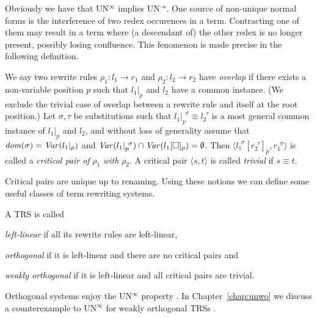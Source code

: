 Obviously we have that UN$^\infty$ implies
UN$^\twoheadrightarrow$. One source of non-unique normal forms is
the interference of two redex occurences in a term. Contracting one of
them may result in a term where (a descendant of) the other redex is
no longer present, possibly losing confluence. This fenomenon is made
precise in the following definition.

\begin{definition}%
We say two rewrite rules $\rho_1 : l_1 \rightarrow r_1$ and $\rho_2 :
l_2 \rightarrow r_2$ have \emph{overlap} if there exists a
non-variable position $p$ such that $l_1 |_p$ and $l_2$ have a common
instance. (We exclude the trivial case of overlap between a rewrite
rule and itself at the root position.)
Let $\sigma, \tau$ be substitutions such that $l_1 |_p ^{\,\;\sigma}
\equiv l_2 ^{\,\;\tau}$ is a most general common instance of $l_1 |_p$
and $l_2$, and without loss of generality assume that $\mathit{dom}(\sigma) =
\mathit{Var}(l_1 |_p)$ and $\mathit{Var}(l_1 |_p ^{\,\;\sigma}) \cap \mathit{Var}(l_1[\Box]_p)
= \emptyset$. Then $\langle l_1 ^{\,\;\sigma}[r_2^{\,\;\tau}]_p,
r_1^{\,\;\sigma} \rangle$ is called a \emph{critical pair of} $\rho_1$
\emph{with} $\rho_2$. A critical pair $\langle s, t \rangle$ is called
\emph{trivial} if $s \equiv t$.
\end{definition}

Critical pairs are unique up to renaming. Using these notions we can
define some useful classes of term rewriting systems.



\begin{definition}%
A TRS is called
\begin{compactenum}
  \item \emph{left-linear} if all its rewrite rules are left-linear,
  \item \emph{orthogonal} if it is left-linear and there are no critical pairs and
  \item \emph{weakly orthogonal} if it is left-linear and all critical pairs
    are trivial.
\end{compactenum}
\end{definition}

Orthogonal systems enjoy the UN$^\infty$ property
\citep{kennaway-95,klop-de-vrijer-05}. In Chapter~\ref{chap:unwo} we
discuss a counterexample to UN$^\infty$ for weakly orthogonal TRSs
\citep{endrullis-10}.
